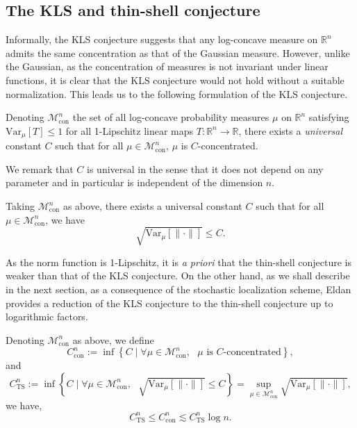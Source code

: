 \subsection{The KLS and thin-shell conjecture}

Informally, the KLS conjecture suggests that any log-concave measure on \(\mathbb{R}^n\) admits 
the same concentration as that of the Gaussian measure. However, unlike the Gaussian, as the 
concentration of measures is not invariant under linear functions, it is clear that the KLS 
conjecture would not hold without a suitable normalization. This leads us to the following formulation 
of the KLS conjecture.

\begin{conjecture}\label{conj:KLS}
  Denoting \(\mathscr{M}^n_{\text{con}}\) the set of all log-concave probability measures \(\mu\) on 
  \(\mathbb{R}^n\) satisfying \(\text{Var}_\mu[T] \le 1\) for all 1-Lipschitz linear maps 
  \(T : \mathbb{R}^n \to \mathbb{R}\), there exists a \textit{universal} constant \(C\) such that for all 
  \(\mu \in \mathscr{M}^n_{\text{con}}\), \(\mu\) is \(C\)-concentrated.
\end{conjecture}

We remark that \(C\) is universal in the sense that it does not depend on any parameter and in 
particular is independent of the dimension \(n\).

\begin{conjecture}
  Taking \(\mathscr{M}^n_{\text{con}}\) as above, there exists a universal constant \(C\) such that 
  for all \(\mu \in \mathscr{M}^n_{\text{con}}\), we have
  \[\sqrt{\text{Var}_\mu[\|\cdot\|]} \le C.\]
\end{conjecture}

As the norm function is 1-Lipschitz, it is \textit{a priori} that the thin-shell conjecture is 
weaker than that of the KLS conjecture. On the other hand, as we shall describe in the next section, 
as a consequence of the stochastic localization scheme, Eldan \cite{Eldan_2013} provides a reduction 
of the KLS conjecture to the thin-shell conjecture up to logarithmic factors. 

\begin{theorem}\label{thm:KLS_to_TS}
  Denoting \(\mathscr{M}^n_{\text{con}}\) as above, we define 
  \[C^n_{\text{con}} := \inf \left\{C \mid \text{\(\forall \mu \in \mathscr{M}^n_{\text{con}},\) 
    \(\mu\) is \(C\)-concentrated}\right\},\]
  and 
  \[C^n_{\text{TS}} := \inf \left\{C \mid \text{\(\forall \mu \in \mathscr{M}^n_{\text{con}},\) 
      \(\sqrt{\text{Var}_\mu[\|\cdot\|]} \le C\)}\right\}
      = \sup_{\mu \in \mathscr{M}^n_{\text{con}}} \sqrt{\text{Var}_\mu[\|\cdot\|]},\]
  we have,
  \[C^n_{\text{TS}} \le C^n_{\text{con}} \lesssim C^n_{\text{TS}} \log n.\]
\end{theorem}

